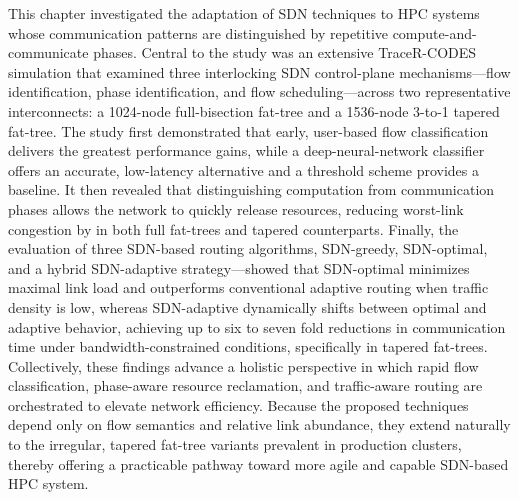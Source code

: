 This chapter investigated the adaptation of SDN techniques to HPC systems whose
communication patterns are distinguished by repetitive compute-and-communicate
phases. Central to the study was an extensive TraceR-CODES simulation that
examined three interlocking SDN control-plane mechanisms—flow identification,
phase identification, and flow scheduling—across two representative
interconnects: a 1024-node full-bisection fat-tree and a 1536-node 3-to-1
tapered fat-tree. The study first demonstrated that early, user-based flow
classification delivers the greatest performance gains, while a
deep-neural-network classifier offers an accurate, low-latency alternative and a
threshold scheme provides a baseline. It then revealed that distinguishing
computation from communication phases allows the network to quickly release
resources, reducing worst-link congestion by in both full
fat-trees and tapered counterparts. Finally, the evaluation of
three SDN-based routing algorithms, SDN-greedy, SDN-optimal, and a hybrid
SDN-adaptive strategy—showed that SDN-optimal minimizes maximal link load and
outperforms conventional adaptive routing when traffic density is low, whereas
SDN-adaptive dynamically shifts between optimal and adaptive behavior, achieving
up to six to seven fold reductions in communication time under
bandwidth-constrained conditions, specifically in tapered fat-trees.
Collectively, these findings advance a holistic perspective in which rapid flow
classification, phase-aware resource reclamation, and traffic-aware routing are
orchestrated to elevate network efficiency. Because the proposed techniques
depend only on flow semantics and relative link abundance, they extend naturally
to the irregular, tapered fat-tree variants prevalent in production clusters,
thereby offering a practicable pathway toward more agile and capable SDN-based
HPC system.
